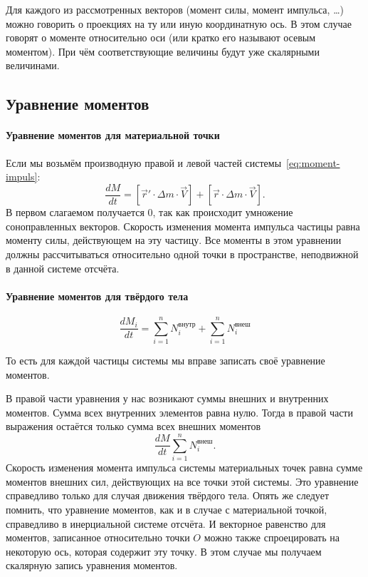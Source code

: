 \documentclass[10pt]{extbook}
\begin{document}
Для каждого из рассмотренных векторов (момент силы, момент импульса, \dots)
можно говорить о проекциях на ту или иную координатную ось. В этом случае
говорят о моменте относительно оси (или кратко его называют осевым моментом).
При чём соответствующие величины будут уже скалярными величинами.

\subsection{Уравнение моментов}%

\paragraph{Уравнение моментов для материальной точки}

Если мы возьмём производную правой и левой частей
системы~\ref{eq:moment-impuls}: \[
	\frac{d M}{d t} = [\vec{r}' \cdot \Delta m \cdot \vec{V}] + [\vec{r} \cdot \Delta m \cdot \vec{V}]
	.\] В первом слагаемом получается 0, так как происходит умножение
соноправленных векторов. Скорость изменения момента импульса частицы равна
моменту силы, действующем на эту частицу. Все моменты в этом уравнении должны
рассчитываться относительно одной точки в пространстве, неподвижной в данной
системе отсчёта.

\paragraph{Уравнение моментов для твёрдого тела}

\begin{equation}
	\frac{d M_i}{d t} = \sum_{i=1}^{n} N_i^\text{внутр} + \sum_{i=1}^{n} N_i^\text{внеш}
\end{equation}

То есть для каждой частицы системы мы вправе записать своё уравнение моментов.

В правой части уравнения у нас возникают суммы внешних и внутренних моментов.
Сумма всех внутренних элементов равна нулю. Тогда в правой части выражения
остаётся только сумма всех внешних моментов \[
	\frac{d M}{d t} \sum_{i=1}^{n} N_i^\text{внеш}
	.\] Скорость изменения момента импульса системы материальных точек равна
сумме моментов внешних сил, действующих на все точки этой системы. Это
уравнение справедливо только для случая движения твёрдого тела. Опять же
следует помнить, что уравнение моментов, как и в случае с материальной
точкой, справедливо в инерциальной системе отсчёта. И векторное равенство для
моментов, записанное относительно точки \( O \) можно также спроецировать на
некоторую ось, которая содержит эту точку. В этом случае мы получаем
скалярную запись уравнения моментов.
\end{document}
